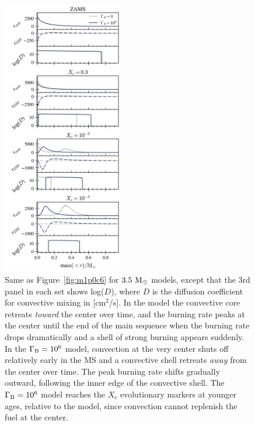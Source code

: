 \documentclass[useAMS,usenatbib]{mnras}
\begin{document}
  \begin{figure}
    \centering
    \includegraphics[width=0.47\textwidth]{plots/m3p5.png}
    \caption{Same as Figure~\ref{fig:m1p0c6} for $3.5 \ \mathrm{M}_{\odot}$ models, except that the 3rd panel in each set shows log($D$), where $D$ is the diffusion coefficient for convective mixing in [cm$^2$/s]. In the \nodm model the convective core retreats \textit{toward} the center over time, and the burning rate peaks at the center until the end of the main sequence when the burning rate drops dramatically and a shell of strong burning appears suddenly. In the $\Gamma_\mathrm{B} = 10^{6}$ model, convection at the very center shuts off relatively early in the MS and a convective shell retreats \textit{away} from the center over time. The peak burning rate shifts gradually outward, following the inner edge of the convective shell. The $\Gamma_\mathrm{B} = 10^{6}$ model reaches the $X_c$ evolutionary markers at younger ages, relative to the \nodm model, since convection cannot replenish the fuel at the center.
    }
    \label{fig:m3p5}
  \end{figure}
\end{document}
